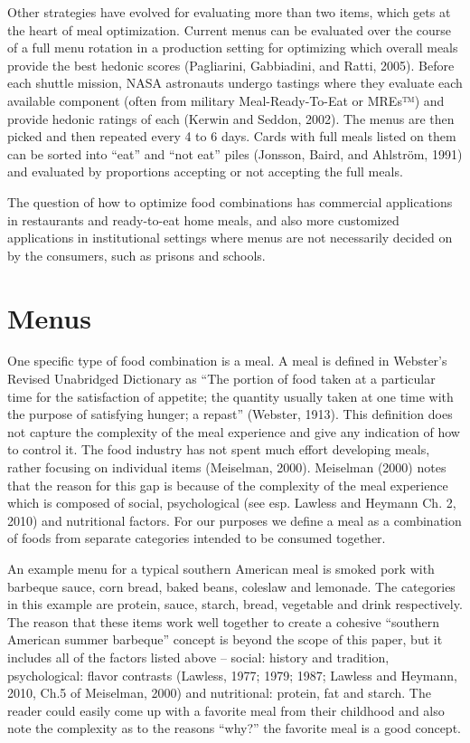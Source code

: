 Other strategies have evolved for evaluating more than two items, which gets at the heart of meal optimization.  Current menus can be evaluated over the course of a full menu rotation in a production setting for optimizing which overall meals provide the best hedonic scores (Pagliarini, Gabbiadini, and Ratti, 2005). Before each shuttle mission, NASA astronauts undergo tastings where they evaluate each available component (often from military Meal-Ready-To-Eat or MREs™) and provide hedonic ratings of each (Kerwin and Seddon, 2002).  The menus are then picked and then repeated every 4 to 6 days.  Cards with full meals listed on them can be sorted into “eat” and “not eat” piles (Jonsson, Baird, and Ahlström, 1991) and evaluated by proportions accepting or not accepting the full meals.

The question of how to optimize food combinations has commercial applications in restaurants and ready-to-eat home meals, and also more customized applications in institutional settings where menus are not necessarily decided on by the consumers, such as prisons and schools.

\section{Menus}
One specific type of food combination is a meal.  A meal is defined in Webster’s Revised Unabridged Dictionary as “The portion of food taken at a particular time for the satisfaction of appetite; the quantity usually taken at one time with the purpose of satisfying hunger; a repast” (Webster, 1913).  This definition does not capture the complexity of the meal experience and give any indication of how to control it.  The food industry has not spent much effort developing meals, rather focusing on individual items (Meiselman, 2000).  Meiselman (2000) notes that the reason for this gap is because of the complexity of the meal experience which is composed of social, psychological (see esp. Lawless and Heymann Ch. 2, 2010)  and nutritional factors.  For our purposes we define a meal as a combination of foods from separate categories intended to be consumed together. 
 
An example menu for a typical southern American meal is smoked pork with barbeque sauce, corn bread, baked beans, coleslaw and lemonade.  The categories in this example are protein, sauce, starch, bread, vegetable and drink respectively.  The reason that these items work well together to create a cohesive “southern American summer barbeque” concept is beyond the scope of this paper, but it includes all of the factors listed above – social: history and tradition, psychological: flavor contrasts (Lawless, 1977; 1979; 1987; Lawless and Heymann, 2010, Ch.5 of Meiselman, 2000) and nutritional: protein, fat and starch.  The reader could easily come up with a favorite meal from their childhood and also note the complexity as to the reasons “why?” the favorite meal is a good concept.  
 
